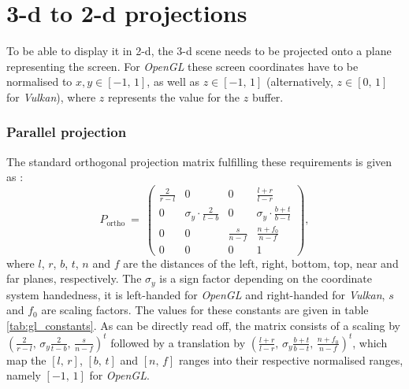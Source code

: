 \section{3-d to 2-d projections}
\label{sec:gl_projs}
To be able to display it in 2-d, the 3-d scene needs to be projected onto a plane representing the screen.
For \textit{OpenGL} these screen coordinates have to be normalised to $x, y \in \left[-1,\, 1\right]$,
as well as $z \in \left[-1,\, 1\right]$ (alternatively, $z \in \left[0,\, 1\right]$ for \textit{Vulkan}),
where $z$ represents the value for the $z$ buffer.

\subsubsection{Parallel projection}
The standard orthogonal projection matrix fulfilling these requirements is given as
\cite{web_gl_ortho} \cite[p. 82]{Sellers2002}:
\begin{equation}
	P_{\mathrm{ortho}} \ =\
		\left( \begin{array}{cccc}
			\frac{2}{r-l} &                             0 &              0 &  \frac{l+r}{l-r}                  \\
			            0 &  \sigma_y \cdot \frac{2}{t-b} &              0 &  \sigma_y \cdot \frac{b+t}{b-t}   \\
			            0 &                             0 &  \frac{s}{n-f} &  \frac{n+f_0}{n-f}                \\
			            0 &                             0 &              0 &  1
		\end{array} \right),
\end{equation}
where $l$, $r$, $b$, $t$, $n$ and $f$ are the distances of the left, right, bottom, top, near and far planes,
respectively.
The $\sigma_y$ is a sign factor depending on the coordinate system handedness, it is left-handed for
\textit{OpenGL} and right-handed for \textit{Vulkan},
$s$ and $f_0$ are scaling factors. The values for these constants are given in table \ref{tab:gl_constants}.
As can be directly read off, the matrix consists of a scaling by
$\left(\frac{2}{r-l}, \, \sigma_y \frac{2}{t-b}, \, \frac{s}{n-f} \right)^t$
followed by a translation by
$\left( \frac{l+r}{l-r}, \, \sigma_y \frac{b+t}{b-t}, \, \frac{n+f_0}{n-f} \right)^t$,
which map the $\left[l,\,r\right]$, $\left[b,\,t\right]$ and $\left[n,\,f\right]$ ranges into their respective
normalised ranges, namely $\left[-1,\, 1\right]$ for \textit{OpenGL}.




